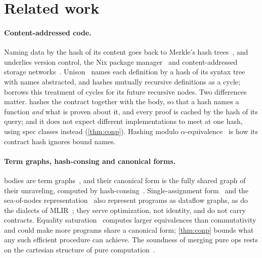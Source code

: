 \section{Related work}\label{sec:related}

\paragraph{Content-addressed code.}
Naming data by the hash of its content goes back to Merkle's hash trees~\cite{merkle1987}, and
underlies version control, the Nix package manager~\cite{dolstra2006thesis} and content-addressed
storage networks~\cite{benet2014ipfs}. Unison~\cite{unison} names each definition by a hash of
its syntax tree with names abstracted, and hashes mutually recursive definitions as a cycle;
\VG{} borrows this treatment of cycles for its future recursive nodes. Two differences matter.
\VG{} hashes the contract together with the body, so that a hash names a function \emph{and}
what is proven about it, and every proof is cached by the hash of its query; and it does not
expect different implementations to meet at one hash, using spec classes instead
(\cref{thm:conp}). Hashing modulo $\alpha$-equivalence~\cite{maziarz2021hashing} is how its
contract hash ignores bound names.

\paragraph{Term graphs, hash-consing and canonical forms.}
\VG{} bodies are term graphs~\cite{ariola1996equational}, and their canonical form is the fully
shared graph of their unraveling, computed by hash-consing~\cite{filliatre2006hashcons}.
Single-assignment form~\cite{cytron1991ssa} and the sea-of-nodes
representation~\cite{click1995simple} also represent programs as dataflow graphs, as do the
dialects of MLIR~\cite{lattner2021mlir}; they serve optimization, not identity, and do not carry
contracts. Equality saturation~\cite{tate2009equality,willsey2021egg,zhang2023egglog} computes
larger equivalences than commutativity and could make more programs share a canonical form;
\cref{thm:conp} bounds what any such efficient procedure can achieve. The soundness of merging
pure ops rests on the cartesian structure of pure computation~\cite{fox1976coalgebras}.

